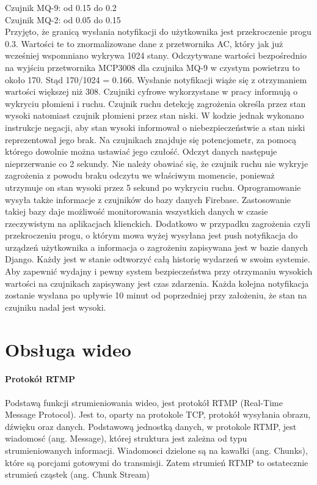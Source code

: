 Czujnik MQ-9: od 0.15 do 0.2\\
Czujnik MQ-2: od 0.05 do 0.15\\
Przyjęto, że granicą wysłania notyfikacji do użytkownika jest przekroczenie progu 0.3. Wartości te to znormalizowane dane z przetwornika AC, który jak już wcześniej wspomniano wykrywa 1024 stany. Odczytywane wartości bezpośrednio na wyjściu przetwornika MCP3008 dla czujnika MQ-9 w czystym powietrzu to około 170. Stąd 170/1024 = 0.166. Wysłanie notyfikacji wiąże się z otrzymaniem wartości większej niż 308.
Czujniki cyfrowe wykorzystane w pracy informują o wykryciu płomieni i ruchu. Czujnik ruchu detekcję zagrożenia określa przez stan wysoki natomiast czujnik płomieni przez stan niski. W kodzie jednak wykonano instrukcje negacji, aby stan wysoki informował o niebezpieczeństwie a stan niski reprezentował jego brak. Na czujnikach znajduje się potencjometr, za pomocą którego dowolnie można ustawiać jego czułość. Odczyt danych następuje nieprzerwanie co 2 sekundy. Nie należy obawiać się, że czujnik ruchu nie wykryje zagrożenia z powodu braku odczytu we właściwym momencie, ponieważ utrzymuje on stan wysoki przez 5 sekund po wykryciu ruchu. Oprogramowanie wysyła także informacje z czujników do bazy danych Firebase. Zastosowanie takiej bazy daje możliwość monitorowania wszystkich danych w czasie rzeczywistym na aplikacjach klienckich. Dodatkowo w przypadku zagrożenia czyli przekroczeniu progu, o którym mowa wyżej wysyłana jest push notyfikacja do urządzeń użytkownika a informacja o zagrożeniu zapisywana jest w bazie danych Django. Każdy jest w stanie odtworzyć całą historię wydarzeń w swoim systemie.
Aby zapewnić wydajny i pewny system bezpieczeństwa przy otrzymaniu wysokich wartości na czujnikach zapisywany jest czas zdarzenia. Każda kolejna notyfikacja zostanie wysłana po upływie 10 minut od poprzedniej przy założeniu, że stan na czujniku nadal jest wysoki. 

\section{Obsługa wideo}

\paragraph{Protokół RTMP}
Podstawą funkcji strumieniowania wideo, jest protokół RTMP (Real-Time Message Protocol). Jest to, oparty na protokole TCP, protokół wysyłania obrazu, dźwięku oraz danych. 
Podstawową jednostką danych, w protokole RTMP, jest wiadomosć (ang. Message), której struktura jest zależna od typu strumieniowanych informacji. 
Wiadomosci dzielone są na kawałki (ang. Chunks), które są porcjami gotowymi do transmisji. Zatem strumień RTMP to ostatecznie strumień cząstek (ang. Chunk Stream)

